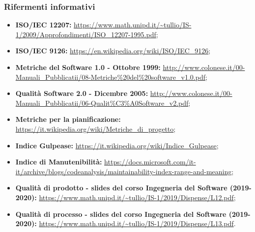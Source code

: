 \subsubsection{Rifermenti informativi}
\begin{itemize}
\item \textbf{ISO/IEC 12207:} \url{https://www.math.unipd.it/~tullio/IS-1/2009/Approfondimenti/ISO_12207-1995.pdf};
\item \textbf{ISO/IEC 9126:} \url{https://en.wikipedia.org/wiki/ISO/IEC_9126};
\item \textbf{Metriche del Software 1.0 - Ottobre 1999:} \url{http://www.colonese.it/00-Manuali_Pubblicatii/08-Metriche\%20del\%20software_v1.0.pdf};
\item \textbf{Qualità Software 2.0 - Dicembre 2005:} \url{http://www.colonese.it/00-Manuali_Pubblicatii/06-Qualit\%C3\%A0Software_v2.pdf};
\item \textbf{Metriche per la pianificazione:} \url{https://it.wikipedia.org/wiki/Metriche_di_progetto};
\item \textbf{Indice Gulpease:} \url{https://it.wikipedia.org/wiki/Indice_Gulpease};
\item \textbf{Indice di Manutenibilità:} \url{https://docs.microsoft.com/it-it/archive/blogs/codeanalysis/maintainability-index-range-and-meaning};
\item \textbf{Qualità di prodotto - slides del corso Ingegneria del Software (2019-2020):} \url{https://www.math.unipd.it/~tullio/IS-1/2019/Dispense/L12.pdf};
\item \textbf{Qualità di processo - slides del corso Ingegneria del Software (2019-2020):} \url{https://www.math.unipd.it/~tullio/IS-1/2019/Dispense/L13.pdf}.
\end{itemize}

